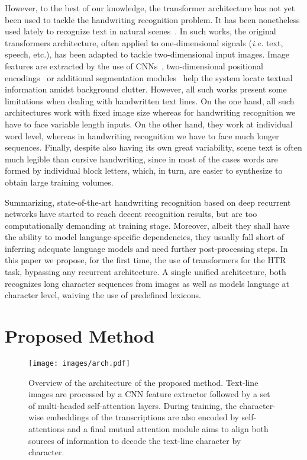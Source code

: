 \documentclass[10pt,twocolumn,letterpaper]{article}
\begin{document}
However, to the best of our knowledge, the transformer architecture has not yet been used to tackle the handwriting recognition problem. It has been nonetheless used lately to recognize text in natural scenes~\cite{lu2019master}. In such works, the original transformers architecture, often applied to one-dimensional signals (\emph{i.e.} text, speech, etc.), has been adapted to tackle two-dimensional input images. Image features are extracted by the use of CNNs~\cite{sheng2019nrtr}, two-dimensional positional encodings~\cite{lee2019recognizing,bleeker2019bidirectional} or additional segmentation modules~\cite{bartz2019kiss} help the system locate textual information amidst background clutter. However, all such works present some limitations when dealing with handwritten text lines. On the one hand, all such architectures work with fixed image size whereas for handwriting recognition we have to face variable length inputs. On the other hand, they work at individual word level, whereas in handwriting recognition we have to face much longer sequences. Finally, despite also having its own great variability, scene text is often much legible than cursive handwriting, since in most of the cases words are formed by individual block letters, which, in turn, are easier to synthesize to obtain large training volumes.

Summarizing, state-of-the-art handwriting recognition based on deep recurrent networks have started to reach decent recognition results, but are too computationally demanding at training stage. Moreover, albeit they shall have the ability to model language-specific dependencies, they usually fall short of inferring adequate language models and need further post-processing steps. In this paper we propose, for the first time, the use of transformers for the HTR task, bypassing any recurrent architecture. A single unified architecture, both recognizes long character sequences from images as well as models language at character level, waiving the use of predefined lexicons.
\section{Proposed Method}

\begin{figure*}[t!h]
    \centering
    \texttt{[image: images/arch.pdf]}
    \caption{Overview of the architecture of the proposed method. Text-line images are processed by a CNN feature extractor followed by a set of multi-headed self-attention layers. During training, the character-wise embeddings of the transcriptions are also encoded by self-attentions and a final mutual attention module aims to align both sources of information to decode the text-line character by character.}
    \label{fig:arch}
\end{figure*}
\end{document}
